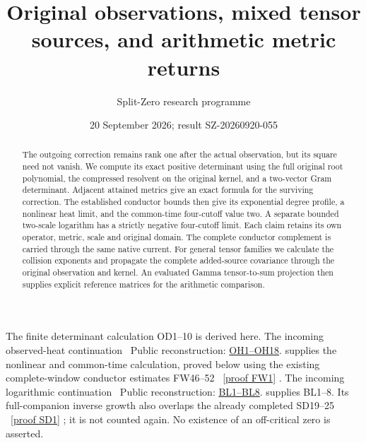 \documentclass[11pt]{article}
\title{Original observations, mixed tensor sources, and arithmetic metric returns}
\author{Split-Zero research programme}
\date{20 September 2026; result SZ-20260920-055}
\begin{document}
\maketitle
\begin{abstract}
The outgoing correction remains rank one after the actual observation,
but its square need not vanish. We compute its exact positive determinant
using the full original root polynomial, the compressed resolvent on the
original kernel, and a two-vector Gram determinant. Adjacent attained
metrics give an exact formula for the surviving correction. The established
conductor bounds then give its exponential degree profile, a nonlinear
heat limit, and the common-time four-cutoff value two. A separate bounded
two-scale logarithm has a strictly negative four-cutoff limit. Each claim
retains its own operator, metric, scale and original domain. The complete
conductor complement is carried through the same native current.
For general tensor families we calculate the collision exponents and
propagate the complete added-source covariance through the original
observation and kernel. An evaluated Gamma tensor-to-sum projection
then supplies explicit reference matrices for the arithmetic comparison.
\end{abstract}

The finite determinant calculation OD1--10 is derived here. The incoming
observed-heat continuation \cite{OHinput}%
~Public reconstruction: \href{https://github.com/KokunoYumeto/zeta-function-research-reader/blob/689a8f87e9c12b7a99b01b3123438c6751ee608f/workbenches/splitzero-tandem/continuations/20260921-kernel-degree-steps/providers/OBSERVATION_COMPLETE_PROOFS.tex\#L203}{OH1--OH18}.%
{} supplies the nonlinear and
common-time calculation, proved below using the existing complete-window
conductor estimates FW46--52 \cite{FW}%
~\href{https://github.com/KokunoYumeto/zeta-function-research-reader/blob/5992ad50c0f2a06921f1fcaded7b4e38097c0739/workbenches/splitzero-tandem/continuations/20260920-original-kernel-mixed-determinants/providers/FULL_WINDOW_SOURCE_PRODUCTS.tex\#L28}{[proof FW1]}%
{}. The incoming logarithmic
continuation \cite{BLinput}%
~Public reconstruction: \href{https://github.com/KokunoYumeto/zeta-function-research-reader/blob/689a8f87e9c12b7a99b01b3123438c6751ee608f/workbenches/splitzero-tandem/continuations/20260921-kernel-degree-steps/providers/OBSERVATION_COMPLETE_PROOFS.tex\#L499}{BL1--BL8}.%
{} supplies BL1--8. Its full-companion inverse
growth also overlaps the already completed SD19--25 \cite{SD}%
~\href{https://github.com/KokunoYumeto/zeta-function-research-reader/blob/5992ad50c0f2a06921f1fcaded7b4e38097c0739/workbenches/splitzero-tandem/continuations/20260920-original-kernel-mixed-determinants/providers/ORIGINAL_SPECTRAL_DETERMINANT.tex\#L34}{[proof SD1]}%
{}; it is
not counted again. No existence of an off-critical zero is asserted.
\end{document}
